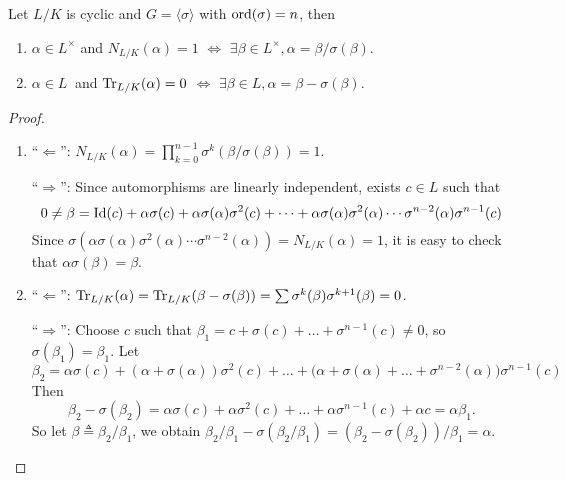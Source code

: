 \begin{theorem} \label{thm:Hilbert-theorem-90}
  Let $L/K$ is cyclic and $G = \langle \sigma \rangle$ with $\operatorname{ord}(\sigma) = n$, then
  \begin{enumerate}
    \item $\alpha \in L^\times$ and $N_{L/K}(\alpha) = 1$ $\iff$ $\exists \beta \in L^\times, \alpha = \beta / \sigma(\beta)$.
    \item $\alpha \in L^{\ }$ and $\operatorname{Tr}_{L/K}(\alpha) = 0$ $\iff$ $\exists \beta \in L, \alpha = \beta - \sigma(\beta)$.
  \end{enumerate}

  \begin{proof} \hfill
    \begin{enumerate}
      \item ``$\Leftarrow$'': $N_{L/K}(\alpha) = \prod_{k=0}^{n-1} \sigma^k(\beta / \sigma(\beta)) = 1$.

        ``$\Rightarrow$'':  Since automorphisms are linearly independent, exists $c \in L$
        such that
        \[ 0 \neq \beta = {\rm Id}(c) + \alpha \sigma(c) + \alpha \sigma(\alpha) \sigma^2(c)
          + \dots + \alpha \sigma(\alpha) \sigma^2(\alpha) \dotsm \sigma^{n-2}(\alpha) \sigma^{n-1}(c) \]
        Since $\sigma(\alpha \sigma(\alpha) \sigma^2(\alpha) \dotsm \sigma^{n-2}(\alpha)) = N_{L/K}(\alpha) = 1$,
        it is easy to check that $\alpha \sigma(\beta) = \beta$.

      \item ``$\Leftarrow$'': $\operatorname{Tr}_{L/K}(\alpha) = \operatorname{Tr}_{L/K}(\beta - \sigma(\beta)) = \sum \sigma^k(\beta)
        \sigma^{k+1}(\beta) = 0$.

        ``$\Rightarrow$'':
        Choose $c$ such that $\beta_1 = c + \sigma(c) + \dots + \sigma^{n-1}(c) \neq 0$, so $\sigma(\beta_1) = \beta_1$.
        Let
        \[ \beta_2 = \alpha \sigma(c) + (\alpha + \sigma(\alpha)) \sigma^2(c) + \dots +
          \big( \alpha + \sigma(\alpha) + \dots + \sigma^{n-2}(\alpha) \big) \sigma^{n-1}(c) \]
        Then
        \[ \beta_2 - \sigma(\beta_2) = \alpha \sigma(c) + \alpha \sigma^2(c) + \dots + \alpha \sigma^{n-1}(c)
          + \alpha c = \alpha \beta_1. \]
        So let $\beta \triangleq \beta_2 / \beta_1$, we obtain $\beta_2/\beta_1 - \sigma(\beta_2/\beta_1) =
        (\beta_2 - \sigma(\beta_2)) / \beta_1 = \alpha$.
    \end{enumerate}
  \end{proof}
\end{theorem}

